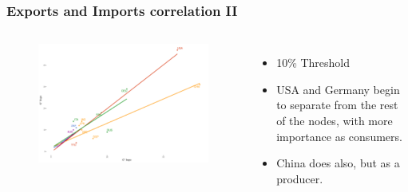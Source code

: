 \documentclass[professionalfont,fleqn]{beamer}
\begin{document}
			\begin{frame}
		\frametitle{Exports and Imports correlation II}
		\begin{columns}[c] %
			
		
		\begin{flushleft}
			\begin{figure}
				\includegraphics[width=\linewidth]{corr_grados_2011_10_pcnt}
			\end{figure}
		\end{flushleft}
		
		
		\begin{itemize}
			\item 10\% Threshold
			\item USA and Germany begin to separate from the rest of the nodes, with more importance as consumers.
			\item China does also, but as a producer.
		\end{itemize}
		\end{columns}
	\end{frame}
\end{document}
